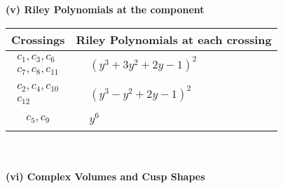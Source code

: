 \documentclass[1p]{elsarticle_modified}
\theoremstyle{definition}
\begin{document}
\newpage\renewcommand{\arraystretch}{1}
\flushleft \textbf{(v) Riley Polynomials at the component}\newline \\
\begin{tabular}{m{50pt}|m{274pt}}
Crossings & \hspace{64pt}Riley Polynomials at each crossing \\
\hline $$\begin{aligned}c_{1},c_{3},c_{6}\\c_{7},c_{8},c_{11}\end{aligned}$$&$\begin{aligned}
&(y^3+3 y^2+2 y-1)^2
\end{aligned}$\\
\hline $$\begin{aligned}c_{2},c_{4},c_{10}\\c_{12}\end{aligned}$$&$\begin{aligned}
&(y^3- y^2+2 y-1)^2
\end{aligned}$\\
\hline $$\begin{aligned}c_{5},c_{9}\end{aligned}$$&$\begin{aligned}
&y^6
\end{aligned}$\\
\hline
\end{tabular}\\~\\
\newpage\flushleft \textbf{(vi) Complex Volumes and Cusp Shapes}
\end{document}
